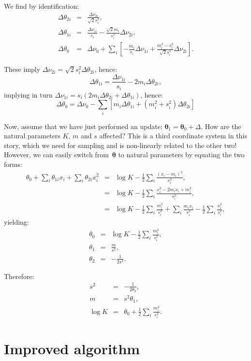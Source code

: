 \documentclass{article}
\def\th{{\boldsymbol{\theta}}}
\begin{document}
We find by identification: 
\begin{eqnarray*}
\Delta\theta_{2i} & = & \frac{\Delta\nu_{2i}}{\sqrt{2}s_i^2},\\
\Delta\theta_{1i} & = & 
\frac{\Delta\nu_{1i}}{s_i} - \frac{\sqrt{2}m_i}{s_i^2}\Delta\nu_{2i},\\
\Delta\theta_0 & = & \Delta\nu_0 + \sum_i \left[
-\frac{m_i}{s_i}\Delta\nu_{1i} + \frac{m_i^2 - s_i^2}{\sqrt{2}s_i^2} \Delta\nu_{2i}
\right].
\end{eqnarray*}

These imply $\Delta\nu_{2i} = \sqrt{2}s_i^2 \Delta\theta_{2i}$, hence:
$$
\Delta\theta_{1i} = 
\frac{\Delta\nu_{1i}}{s_i} - 2m_i \Delta \theta_{2i},
$$
implying in turn $\Delta\nu_{1i} = s_i(2m_i \Delta\theta_{2i} + \Delta\theta_{1i})$, hence:
$$
\Delta\theta_0 = \Delta\nu_0 - \sum_i \left[
m_i \Delta\theta_{1i} + (m_i^2 + s_i^2) \Delta\theta_{2i}
\right]
$$

Now, assume that we have just performed an update: $\th_1 = \th_0 + \Delta$. How are the natural parameters $K$, $m$ and $s$ affected? This is a third coordinate system in this story, which we need for sampling and is non-linearly related to the other two! However, we can easily switch from~$\th$ to natural parameters by equating the two forms:
\begin{eqnarray*}
\theta_0 + \sum_i \theta_{1i} x_i + \sum_i \theta_{2i} x_i^2
& = & \log K - \frac{1}{2} \sum_i \frac{(x_i-m_i)^2}{s_i^2},\\
& = & \log K - \frac{1}{2} \sum_i \frac{x_i^2 - 2 m_ix_i + m_i^2}{s_i^2},\\
& = & \log K - \frac{1}{2} \sum_i \frac{m_i^2}{s_i^2} 
+ \sum_i \frac{m_i x_i}{s_i^2} 
- \frac{1}{2} \sum_i \frac{x_i^2}{s_i^2},
\end{eqnarray*}
yielding:
\begin{eqnarray*}
\theta_0 & = & \log K -\frac{1}{2}\sum_i \frac{m_i^2}{s_i^2},\\
\theta_1 & = & \frac{m}{s^2},\\
\theta_2 & = & -\frac{1}{2 s^2}.
\end{eqnarray*}

Therefore:
\begin{eqnarray*}
s^2 & = & -\frac{1}{2\theta_2},\\
m & = & s^2 \theta_1,\\
\log K & = & \theta_0 + \frac{1}{2}\sum_i \frac{m_i^2}{s_i^2}.
\end{eqnarray*}


\section{Improved algorithm}
\end{document}
